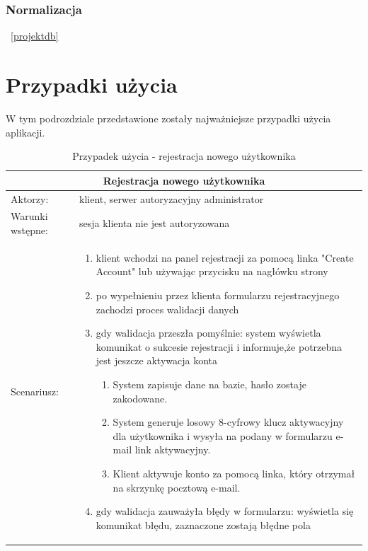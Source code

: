 \subsubsection{Normalizacja}
~\ref{projektdb}

\clearpage
\section{Przypadki użycia}

W tym podrozdziale przedstawione zostały najważniejsze przypadki użycia aplikacji.


\begin{table}[h!]

\begin{tabular}{ |p{2cm}||p{13cm}|  }
	
	\hline
	\multicolumn{2}{|c|}{Rejestracja nowego użytkownika} \\
	\hline
	Aktorzy: &klient, serwer autoryzacyjny administrator\\
	\hline
	Warunki wstępne: & sesja klienta nie jest autoryzowana\\ 
	\hline
	Scenariusz: &
	\begin{enumerate}[leftmargin=0em]
		\item klient wchodzi na panel rejestracji za pomocą linka "Create Account" lub używając przycisku na nagłówku strony 
		
		\item po wypełnieniu przez klienta formularzu rejestracyjnego zachodzi proces walidacji danych

		\item  gdy walidacja przeszła pomyślnie: system wyświetla komunikat o sukcesie rejestracji i informuje,że potrzebna jest jeszcze aktywacja konta

	\begin{enumerate}[leftmargin=2em]
	 	\item  System zapisuje dane na bazie, hasło zostaje zakodowane.
	 		
	 		\item  System generuje losowy 8-cyfrowy klucz aktywacyjny dla użytkownika i wysyła na podany w formularzu e-mail link aktywacyjny.
	 		
	 		\item Klient  aktywuje konto za pomocą linka, który otrzymał na skrzynkę pocztową e-mail.
	\end{enumerate}
		
		\item  gdy walidacja zauważyła błędy w formularzu: wyświetla się komunikat błędu, zaznaczone zostają błędne pola
			\end{enumerate}\\
	\hline

\end{tabular}

	\caption{Przypadek użycia - rejestracja nowego użytkownika}
\end{table}

